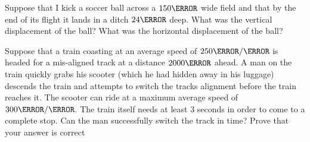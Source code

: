 \documentclass[12pt]{article} %
\begin{document}
\begin{qstn}[10]
Suppose that I kick a soccer ball across a $150\m$ wide field and that by the end of its flight it lands in a ditch $24\m$ deep. What was the vertical displacement of the ball? What was the horizontal displacement of the ball? 

\end{qstn}

\begin{qstn}[11]
Suppose that a train coasting at an average speed of $250 \m / \s$ is headed for a mis-aligned track at a distance $2000\m$ ahead. A man on the train quickly grabs his scooter (which he had hidden away in his luggage) descends the train and attempts to switch the tracks alignment before the train reaches it. The scooter can ride at a maximum average speed of $300 \m / \s$. The train itself needs at least $3$ seconds in order to come to a complete stop. Can the man successfully switch the track in time? Prove that your answer is correct
\end{qstn}
\end{document}

